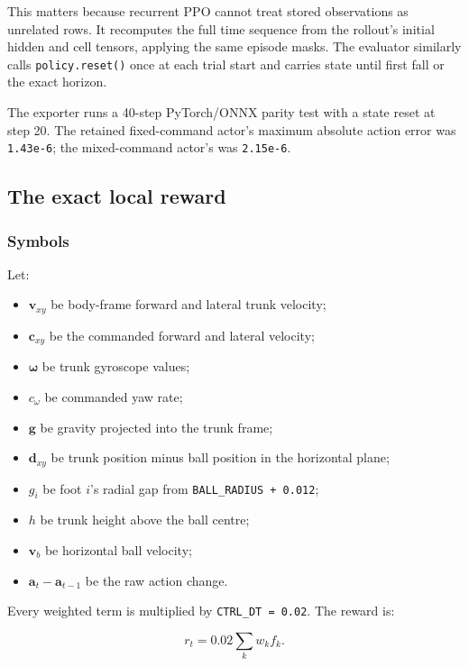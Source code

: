 \documentclass[
  american,
  11pt,
  letterpaper,
]{article}
\providecommand{\tightlist}{%
  \setlength{\itemsep}{0pt}\setlength{\parskip}{0pt}}
\begin{document}
This matters because recurrent PPO cannot treat stored observations as
unrelated rows. It recomputes the full time sequence from the rollout's
initial hidden and cell tensors, applying the same episode masks. The
evaluator similarly calls \texttt{policy.reset()} once at each trial
start and carries state until first fall or the exact horizon.

The exporter runs a 40-step PyTorch/ONNX parity test with a state reset
at step 20. The retained fixed-command actor's maximum absolute action
error was \texttt{1.43e-6}; the mixed-command actor's was
\texttt{2.15e-6}.

\subsection{The exact local reward}\label{the-exact-local-reward}

\subsubsection{Symbols}\label{symbols}

Let:

\begin{itemize}
\tightlist
\item
  \(\mathbf v_{xy}\) be body-frame forward and lateral trunk velocity;
\item
  \(\mathbf c_{xy}\) be the commanded forward and lateral velocity;
\item
  \(\boldsymbol\omega\) be trunk gyroscope values;
\item
  \(c_\omega\) be commanded yaw rate;
\item
  \(\mathbf g\) be gravity projected into the trunk frame;
\item
  \(\mathbf d_{xy}\) be trunk position minus ball position in the
  horizontal plane;
\item
  \(g_i\) be foot \(i\)'s radial gap from
  \texttt{BALL\_RADIUS\ +\ 0.012};
\item
  \(h\) be trunk height above the ball centre;
\item
  \(\mathbf v_b\) be horizontal ball velocity;
\item
  \(\mathbf a_t-\mathbf a_{t-1}\) be the raw action change.
\end{itemize}

Every weighted term is multiplied by \texttt{CTRL\_DT\ =\ 0.02}. The
reward is:

\[
r_t=0.02\sum_k w_k f_k.
\]
\end{document}
